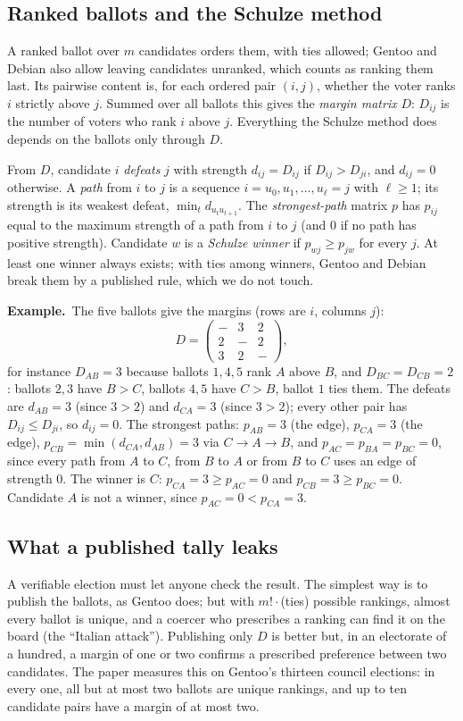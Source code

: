 \documentclass[11pt,a4paper]{article}
\newcommand{\ex}[1]{\par\medskip\noindent\textbf{Example.}~#1\par\medskip}
\theoremstyle{remark}
\begin{document}
\subsection{Ranked ballots and the Schulze method}
A ranked ballot over $m$ candidates orders them, with ties allowed; Gentoo
and Debian also allow leaving candidates unranked, which counts as ranking
them last. Its pairwise content is, for each ordered pair $(i, j)$, whether
the voter ranks $i$ strictly above $j$. Summed over all ballots this gives
the \emph{margin matrix} $D$: $D_{ij}$ is the number of voters who rank $i$
above $j$. Everything the Schulze method does depends on the ballots only
through $D$.

From $D$, candidate $i$ \emph{defeats} $j$ with strength $d_{ij} = D_{ij}$
if $D_{ij} > D_{ji}$, and $d_{ij} = 0$ otherwise. A \emph{path} from $i$ to
$j$ is a sequence $i = u_0, u_1, \ldots, u_\ell = j$ with $\ell \ge 1$; its
strength is its weakest defeat, $\min_t d_{u_t u_{t+1}}$. The
\emph{strongest-path} matrix $p$ has $p_{ij}$ equal to the maximum strength
of a path from $i$ to $j$ (and $0$ if no path has positive strength).
Candidate $w$ is a \emph{Schulze winner} if $p_{wj} \ge p_{jw}$ for every
$j$. At least one winner always exists; with ties among winners, Gentoo and
Debian break them by a published rule, which we do not touch.

\ex{The five ballots give the margins (rows are $i$, columns $j$):
\[
  D = \begin{pmatrix} - & 3 & 2 \\ 2 & - & 2 \\ 3 & 2 & - \end{pmatrix},
\]
for instance $D_{AB} = 3$ because ballots $1, 4, 5$ rank $A$ above $B$, and
$D_{BC} = D_{CB} = 2$: ballots $2, 3$ have $B > C$, ballots $4, 5$ have $C >
B$, ballot $1$ ties them. The defeats are $d_{AB} = 3$ (since $3 > 2$) and
$d_{CA} = 3$ (since $3 > 2$); every other pair has $D_{ij} \le D_{ji}$, so
$d_{ij} = 0$. The strongest paths: $p_{AB} = 3$ (the edge), $p_{CA} = 3$
(the edge), $p_{CB} = \min(d_{CA}, d_{AB}) = 3$ via $C \to A \to B$, and
$p_{AC} = p_{BA} = p_{BC} = 0$, since every path from $A$ to $C$, from $B$
to $A$ or from $B$ to $C$ uses an edge of strength $0$. The winner is $C$:
$p_{CA} = 3 \ge p_{AC} = 0$ and $p_{CB} = 3 \ge p_{BC} = 0$. Candidate $A$
is not a winner, since $p_{AC} = 0 < p_{CA} = 3$.}

\subsection{What a published tally leaks}
A verifiable election must let anyone check the result. The simplest way is
to publish the ballots, as Gentoo does; but with $m! \cdot$(ties) possible
rankings, almost every ballot is unique, and a coercer who prescribes a
ranking can find it on the board (the ``Italian attack''). Publishing only
$D$ is better but, in an electorate of a hundred, a margin of one or two
confirms a prescribed preference between two candidates. The paper measures
this on Gentoo's thirteen council elections: in every one, all but at most
two ballots are unique rankings, and up to ten candidate pairs have a margin
of at most two.
\end{document}
